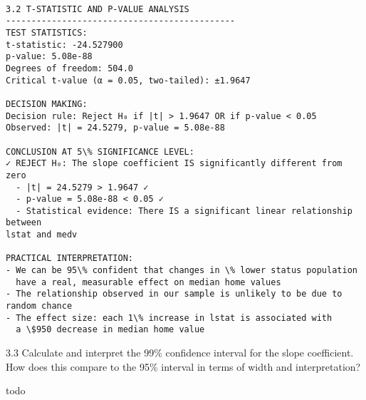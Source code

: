 \documentclass[11pt, twocolumn]{article}
\begin{document}
    \begin{Verbatim}[commandchars=\\\{\}]

3.2 T-STATISTIC AND P-VALUE ANALYSIS
---------------------------------------------
TEST STATISTICS:
t-statistic: -24.527900
p-value: 5.08e-88
Degrees of freedom: 504.0
Critical t-value (α = 0.05, two-tailed): ±1.9647

DECISION MAKING:
Decision rule: Reject H₀ if |t| > 1.9647 OR if p-value < 0.05
Observed: |t| = 24.5279, p-value = 5.08e-88

CONCLUSION AT 5\% SIGNIFICANCE LEVEL:
✓ REJECT H₀: The slope coefficient IS significantly different from zero
  - |t| = 24.5279 > 1.9647 ✓
  - p-value = 5.08e-88 < 0.05 ✓
  - Statistical evidence: There IS a significant linear relationship between
lstat and medv

PRACTICAL INTERPRETATION:
- We can be 95\% confident that changes in \% lower status population
  have a real, measurable effect on median home values
- The relationship observed in our sample is unlikely to be due to random chance
- The effect size: each 1\% increase in lstat is associated with
  a \$950 decrease in median home value
    \end{Verbatim}

    3.3 Calculate and interpret the 99\% confidence interval for the slope
coefficient. How does this compare to the 95\% interval in terms of
width and interpretation?

todo
\end{document}

